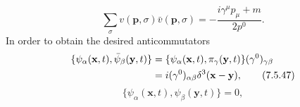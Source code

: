\begin{equation}
\sum_\sigma v(\mathbf p,\sigma)\bar v(\mathbf p,\sigma)
=-\frac{i\gamma^\mu p_\mu+m}{2p^0}.
\tag{7.5.46}\label{eq:7.5.46}
\end{equation}
In order to obtain the desired anticommutators
\begin{align}
\{\psi_\alpha(\mathbf x,t),\bar\psi_\beta(\mathbf y,t)\}
&=\{\psi_\alpha(\mathbf x,t),\pi_\gamma(\mathbf y,t)\}
(\gamma^0)_{\gamma\beta}\notag\\
&=i(\gamma^0)_{\alpha\beta}\delta^3(\mathbf x-\mathbf y),
\tag{7.5.47}\label{eq:7.5.47}
\end{align}
\begin{equation}
\{\psi_\alpha(\mathbf x,t),\psi_\beta(\mathbf y,t)\}=0,
\tag{7.5.48}\label{eq:7.5.48}
\end{equation}
